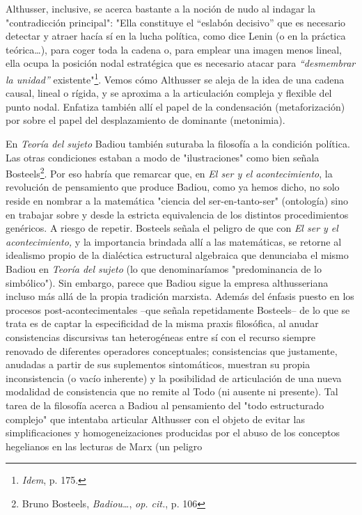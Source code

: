 Althusser, inclusive, se acerca bastante a la noción de nudo al indagar
la "contradicción principal": "Ella constituye el ``eslabón decisivo''
que es necesario detectar y atraer hacía sí en la lucha política, como
dice Lenin (o en la práctica teórica\ldots), para coger toda la cadena
o, para emplear una imagen menos lineal, ella ocupa la posición nodal
estratégica que es necesario atacar para \emph{``desmembrar la unidad''}
existente"\footnote{\emph{Idem}, p. 175.}. Vemos cómo Althusser se aleja
de la idea de una cadena causal, lineal o rígida, y se aproxima a la
articulación compleja y flexible del punto nodal. Enfatiza también allí
el papel de la condensación (metaforización) por sobre el papel del
desplazamiento de dominante (metonimia).

En \emph{Teoría del sujeto} Badiou también suturaba la filosofía a la
condición política. Las otras condiciones estaban a modo de
"ilustraciones" como bien señala Bosteels\footnote{Bruno Bosteels,
  \emph{Badiou\ldots{}}, \emph{op. cit.}, p. 106}. Por eso habría que
remarcar que, en \emph{El ser y el acontecimiento}, la revolución de
pensamiento que produce Badiou, como ya hemos dicho, no solo reside en
nombrar a la matemática "ciencia del ser-en-tanto-ser" (ontología) sino
en trabajar sobre y desde la estricta equivalencia de los distintos
procedimientos genéricos. A riesgo de repetir. Bosteels señala el
peligro de que con \emph{El ser y el acontecimiento,} y la importancia
brindada allí a las matemáticas, se retorne al idealismo propio de la
dialéctica estructural algebraica que denunciaba el mismo Badiou en
\emph{Teoría del sujeto} (lo que denominaríamos "predominancia de lo
simbólico"). Sin embargo, parece que Badiou sigue la empresa
althusseriana incluso más allá de la propia tradición marxista. Además
del énfasis puesto en los procesos post-acontecimentales --que señala
repetidamente Bosteels-- de lo que se trata es de captar la
especificidad de la misma praxis filosófica, al anudar consistencias
discursivas tan heterogéneas entre sí con el recurso siempre renovado de
diferentes operadores conceptuales; consistencias que justamente,
anudadas a partir de sus suplementos sintomáticos, muestran su propia
inconsistencia (o vacío inherente) y la posibilidad de articulación de
una nueva modalidad de consistencia que no remite al Todo (ni ausente ni
presente). Tal tarea de la filosofía acerca a Badiou al pensamiento del
"todo estructurado complejo" que intentaba articular Althusser con el
objeto de evitar las simplificaciones y homogeneizaciones producidas por
el abuso de los conceptos hegelianos en las lecturas de Marx (un peligro
